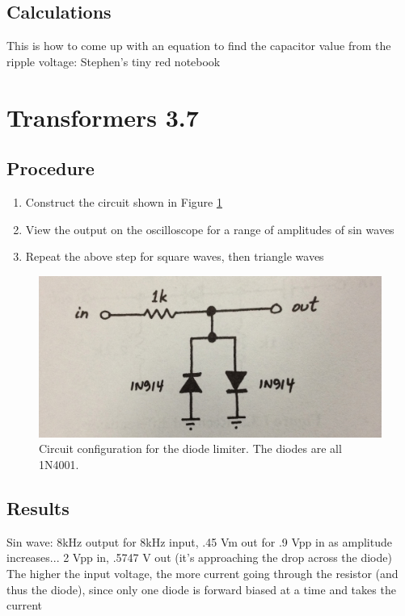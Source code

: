\documentclass[12pt,letterpaper]{report}
\newlength \figwidth
\begin{document}
\subsection*{Calculations}
This is how to come up with an equation to find the capacitor value from the ripple voltage: Stephen's tiny red notebook

\section*{Transformers 3.7}
\subsection*{Procedure}

\begin{enumerate}
\item Construct the circuit shown in Figure \ref{fig:circuit_3}
\item View the output on the oscilloscope for a range of amplitudes of sin waves
\item Repeat the above step for square waves, then triangle waves
\end{enumerate}

\begin{figure}[H]
\centering
\includegraphics[width=\figwidth, keepaspectratio=true]{lab4/circuit_3.jpg}
\caption{Circuit configuration for the diode limiter. The diodes are all 1N4001.}
\label{fig:circuit_3}
\end{figure}

\subsection*{Results}

Sin wave: 8kHz output for 8kHz input, .45 Vm out for .9 Vpp in
as amplitude increases... 2 Vpp in, .5747 V out (it's approaching the drop across the diode)
The higher the input voltage, the more current going through the resistor (and thus the diode), since only one diode is forward biased at a time and takes the current
\end{document}
